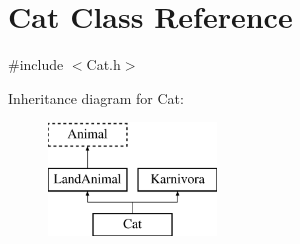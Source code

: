 \hypertarget{classCat}{\section{Cat Class Reference}
\label{classCat}
}


{\ttfamily \#include $<$Cat.\-h$>$}

Inheritance diagram for Cat\-:\begin{figure}[H]
\begin{center}
\leavevmode
\includegraphics[height=3.000000cm]{classCat}
\end{center}
\end{figure}
